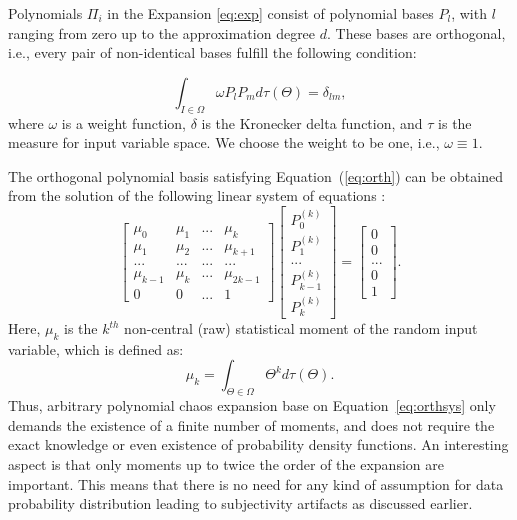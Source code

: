 
Polynomials $\Pi_i$ in the Expansion \ref{eq:exp} consist of polynomial bases
$P_l$, with $l$ ranging from zero up to the approximation degree $d$. These
bases are orthogonal, i.e., every pair of non-identical bases fulfill the
following condition:

\begin{equation}
\int_{I\in\Omega}\omega
P_{l}P_{m}d\tau(\Theta)=\delta_{lm},\label{eq:orth}\end{equation} where $\omega$
is a weight function, $\delta$ is the Kronecker delta function, and $\tau$ is
the measure for input variable space. We choose the weight to be one, i.e.,
$\omega\equiv1$. 

The orthogonal polynomial basis satisfying Equation~(\ref{eq:orth}) can be obtained from the solution of the following linear system of equations \cite{oladyshkin2011concept}: 
%
\begin{equation}
\left[\begin{array}{cccc}
\mu_{0} & \mu_{1} & ... & \mu_{k}\\
\mu_{1} & \mu_{2} & ... & \mu_{k+1}\\
... & ... & ... & ...\\
\mu_{k-1} & \mu_{k} & ... & \mu_{2k-1}\\
0 & 0 & ... & 1\end{array}\right]\left[\begin{array}{c}
P_{0}^{(k)}\\
P_{1}^{(k)}\\
...\\
P_{k-1}^{(k)}\\
P_{k}^{(k)}\end{array}\right]=\left[\begin{array}{c}
0\\
0\\
...\\
0\\
1\end{array}\right].\label{eq:orthsys}\end{equation}
Here, $\mu_{k}$ is the $k^{th}$ non-central (raw) statistical moment of the random input variable, which is defined as:
%
\begin{equation}
\mu_{k}=\int_{\Theta\in\Omega}\Theta^{k}d\tau(\Theta).\label{eq:mnt}
\end{equation}
%
Thus, arbitrary polynomial chaos expansion base on Equation~\ref{eq:orthsys}
only
demands the existence of a finite number of moments, and does not require the
exact knowledge or even existence of probability density functions. An
interesting aspect is that only moments up to twice the order of the expansion
are important. This means that there is no need for any kind of assumption for data
probability distribution leading to subjectivity artifacts as discussed earlier.

